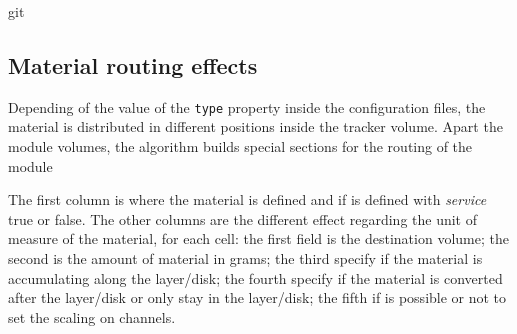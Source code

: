 git\documentclass[12pt, a4paper]{article}
\newcommand{\prop}[1]{\texttt{#1}}
\begin{document}
\subsection{Material routing effects}
Depending of the value of the \prop{type} property inside the
configuration files, the material is distributed in different
positions inside the tracker volume. Apart the module volumes, the
algorithm builds special sections for the routing of the module

The first column is where the material is defined and if is defined
with \emph{service} true or false. The other columns are the different
effect regarding the unit of measure of the material, for each cell:
the first field is the destination volume; the second is the amount of
material in grams; the third specify if the material is accumulating
along the layer/disk; the fourth specify if the material is converted
after the layer/disk or only stay in the layer/disk; the fifth if is
possible or not to set the scaling on channels.
\end{document}
